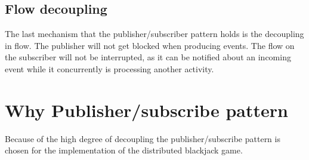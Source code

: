 \FloatBarrier

\subsection{Flow decoupling}
The last mechanism that the publisher/subscriber pattern holds is the decoupling in flow. The publisher will not get blocked when producing events. The flow on the subscriber will not be interrupted, as it can be notified about an incoming event while it concurrently is processing another activity.

\section{Why Publisher/subscribe pattern}
Because of the high degree of decoupling the publisher/subscribe pattern is chosen for the implementation of the distributed blackjack game. 